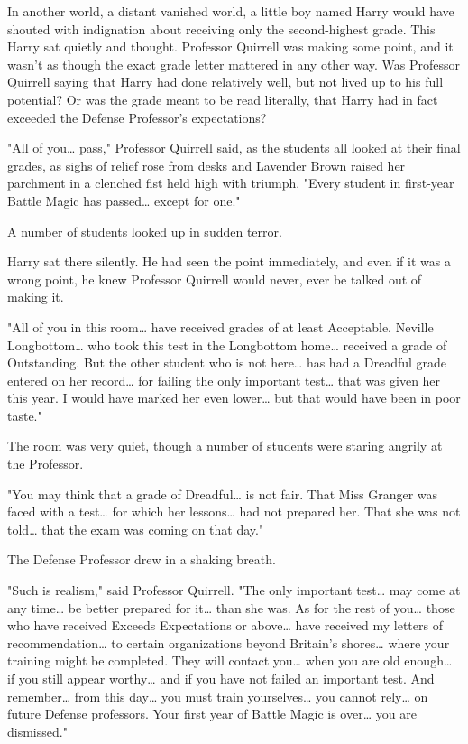 In another world, a distant vanished world, a little boy named Harry would have
shouted with indignation about receiving only the second-highest grade. This
Harry sat quietly and thought. Professor Quirrell was making some point, and it
wasn't as though the exact grade letter mattered in any other way. Was
Professor Quirrell saying that Harry had done relatively well, but not lived up
to his full potential? Or was the grade meant to be read literally, that Harry
had in fact exceeded the Defense Professor's expectations?

"All of you{\ldots} pass," Professor Quirrell said, as the students all looked
at their final grades, as sighs of relief rose from desks and Lavender Brown
raised her parchment in a clenched fist held high with triumph. "Every student
in first-year Battle Magic has passed{\ldots} except for one."

A number of students looked up in sudden terror.

Harry sat there silently. He had seen the point immediately, and even if it was
a wrong point, he knew Professor Quirrell would never, ever be talked out of
making it.

"All of you in this room{\ldots} have received grades of at least Acceptable.
Neville Longbottom{\ldots} who took this test in the Longbottom home{\ldots}
received a grade of Outstanding. But the other student who is not here{\ldots}
has had a Dreadful grade entered on her record{\ldots} for failing the only
important test{\ldots} that was given her this year. I would have marked her
even lower{\ldots} but that would have been in poor taste."

The room was very quiet, though a number of students were staring angrily at
the Professor.

"You may think that a grade of Dreadful{\ldots} is not fair. That Miss Granger
was faced with a test{\ldots} for which her lessons{\ldots} had not prepared
her. That she was not told{\ldots} that the exam was coming on that day."

The Defense Professor drew in a shaking breath.

"Such is realism," said Professor Quirrell. "The only important test{\ldots}
may come at any time{\ldots} be better prepared for it{\ldots} than she was. As
for the rest of you{\ldots} those who have received Exceeds Expectations or
above{\ldots} have received my letters of recommendation{\ldots} to certain
organizations beyond Britain's shores{\ldots} where your training might be
completed. They will contact you{\ldots} when you are old enough{\ldots} if you
still appear worthy{\ldots} and if you have not failed an important test. And
remember{\ldots} from this day{\ldots} you must train yourselves{\ldots} you
cannot rely{\ldots} on future Defense professors. Your first year of Battle
Magic is over{\ldots} you are dismissed."

